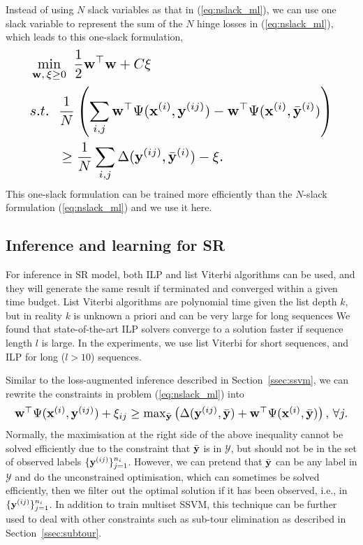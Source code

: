 Instead of using $N$ slack variables as that in (\ref{eq:nslack_ml}),
we can use one slack variable to represent the sum of the $N$ hinge losses in (\ref{eq:nslack_ml}),
which leads to this one-slack formulation,
\begin{equation}
\label{eq:1slack_ml}
\resizebox{0.9\linewidth}{!}{$
\begin{aligned}
& \min_{\w, \, \xi \ge 0} ~\frac{1}{2} \w^\top \w + C \xi \\
& s.t.~~ \frac{1}{N} \left( \sum_{i,j} \w^\top \Psi(\x^{(i)}, \y^{(ij)}) - \w^\top \Psi(\x^{(i)}, \bar{\y}^{(i)}) \right) \\
& \hspace{2em} \ge \frac{1}{N} \sum_{i,j} \Delta(\y^{(ij)}, \bar{\y}^{(i)}) - \xi.
\end{aligned}
$}
\end{equation}
This one-slack formulation can be trained more efficiently than the $N$-slack formulation (\ref{eq:nslack_ml}) and we use it here.




\subsection{Inference and learning for SR}
\label{ssec:SRinf}

For inference in SR model, both ILP and list Viterbi algorithms can be used, and they will generate the
same result if terminated and converged within a given time budget.
List Viterbi algorithms are polynomial time given the list depth $k$,
but in reality $k$ is unknown a priori and can be very large for long sequences
We found that state-of-the-art ILP solvers converge to a solution faster if sequence length $l$ is large.
In the experiments, we use list Viterbi for short sequences, and ILP for long ($l>10$) sequences.

Similar to the loss-augmented inference described in Section~\ref{ssec:ssvm},
we can rewrite the constraints in problem (\ref{eq:nslack_ml}) into
\begin{equation*}
\resizebox{0.99\linewidth}{!}
{$
\w^\top \Psi(\x^{(i)}, \y^{(ij)}) + \xi_{ij} \ge
\max_{\bar{\y}} \left( \Delta(\y^{(ij)}, \bar{\y}) + \w^\top \Psi(\x^{(i)}, \bar{\y}) \right),
\, \forall j.
$}
\end{equation*}
Normally, the maximisation at the right side of the above inequality cannot be solved efficiently due to the constraint that
$\bar{\mathbf{y}}$ is in $\mathcal{Y}$,
but should not be in the set of observed labels $\{\mathbf{y}^{(ij)}\}_{j=1}^{n_i}$.
However, we can pretend that $\bar{\mathbf{y}}$ can be any label in $\mathcal{Y}$ and do the unconstrained optimisation,
which can sometimes be solved efficiently, then we filter out the optimal solution if it has been observed,
i.e., in $\{\mathbf{y}^{(ij)}\}_{j=1}^{n_i}$.
In addition to train multiset SSVM, this technique can be further used to deal with other constraints such as sub-tour elimination
as described in Section~\ref{ssec:subtour}.

